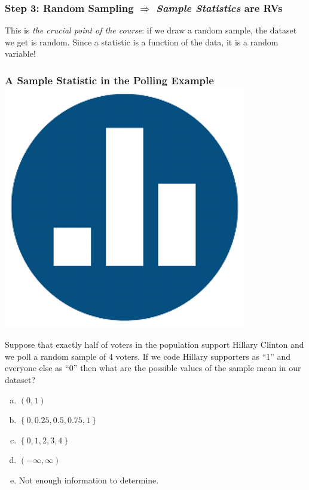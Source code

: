 \begin{frame}
  \frametitle{Step 3: Random Sampling $\Rightarrow$ \emph{Sample Statistics} are RVs} 

  \alert{This is \emph{the crucial point of the course}: if we draw a random sample, the dataset we get is random. Since a statistic is a function of the data, it is a random variable!} 
\end{frame}
\begin{frame}
  \frametitle{A Sample Statistic in the Polling Example \hfill\includegraphics[scale = 0.05]{./images/clicker}}
  Suppose that exactly half of voters in the population support Hillary Clinton and we poll a random sample of 4 voters. If we code Hillary supporters as ``1'' and everyone else as ``0'' then what are the possible values of the sample mean in our dataset?

  \vspace{1em}
  \begin{enumerate}[(a)]
    \item $(0,1)$
    \item $\left\{ 0, 0.25, 0.5, 0.75, 1 \right\}$
    \item $\left\{ 0,1,2,3,4 \right\}$
    \item $(-\infty, \infty)$
    \item Not enough information to determine.
  \end{enumerate}

\end{frame}
